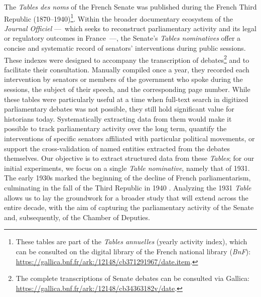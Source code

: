 The \textit{Tables des noms} of the French Senate was published during the French Third Republic (1870–1940)\footnote{These tables are part of the \textit{Tables annuelles} (yearly activity index), which can be consulted on the digital library of the French national library (\textit{BnF}): \href{https://gallica.bnf.fr/ark:/12148/cb371291967/date.item}{https://gallica.bnf.fr/ark:/12148/cb371291967/date.item}.}.
Within the broader documentary ecosystem of the \textit{Journal Officiel} ---~which seeks to reconstruct parliamentary activity and its legal or regulatory outcomes in France~---, the Senate's \textit{Tables nominatives} offer a concise and systematic record of senators' interventions during public sessions.
These indexes were designed to accompany the transcription of debates\footnote{The complete transcriptions of Senate debates can be consulted via Gallica: \href{https://gallica.bnf.fr/ark:/12148/cb34363182v/date}{https://gallica.bnf.fr/ark:/12148/cb34363182v/date}.} and to facilitate their consultation.
Manually compiled once a year, they recorded each intervention by senators or members of the government who spoke during the sessions, the subject of their speech, and the corresponding page number.
%
While these tables were particularly useful at a time when full-text search in digitized parliamentary debates was not possible, they still hold significant value for historians today.
Systematically extracting data from them would make it possible to track parliamentary activity over the long term, quantify the interventions of specific senators affiliated with particular political movements, or support the cross-validation of named entities extracted from the debates themselves.
%
Our objective is to extract structured data from these \textit{Tables}; for our initial experiments, we focus on a single \textit{Table nominative}, namely that of 1931.
The early 1930s marked the beginning of the decline of French parliamentarism, culminating in the fall of the Third Republic in 1940 \cite{morel2024parlement}. Analyzing the 1931 \textit{Table} allows us to lay the groundwork for a broader study that will extend across the entire decade, with the aim of capturing the parliamentary activity of the Senate and, subsequently, of the Chamber of Deputies.



